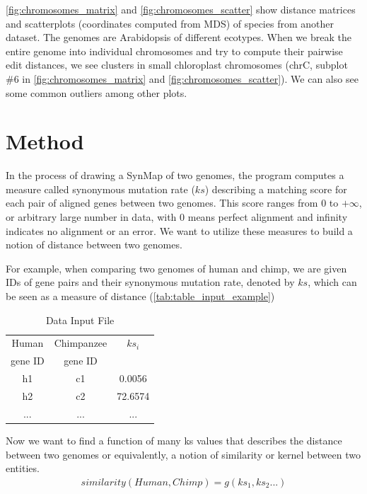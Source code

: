 \documentclass{vgtc}                      %
\begin{document}
\autoref{fig:chromosomes_matrix} and \autoref{fig:chromosomes_scatter} show distance matrices and scatterplots (coordinates computed from MDS) of species from another dataset. The genomes are Arabidopsis of different ecotypes. When we break the entire genome into individual chromosomes and try to compute their pairwise edit distances, we see clusters in small chloroplast chromosomes (chrC, subplot \#6 in \autoref{fig:chromosomes_matrix} and \autoref{fig:chromosomes_scatter}). We can also see some common outliers among other plots.

\section{Method}
In the process of drawing a SynMap of two genomes, the program computes a measure called synonymous mutation rate ($ks$) describing a matching score for each pair of aligned genes between two genomes. This score ranges from $0$ to $+\infty$, or arbitrary large number in data, with $0$ means perfect alignment and infinity indicates no alignment or an error. We want to utilize these measures to build a notion of distance between two genomes. 

For example, when comparing two genomes of human and chimp, we are given IDs of gene pairs and their synonymous mutation rate, denoted by $ks$, which can be seen as a measure of distance (\autoref{tab:table_input_example})

\begin{table}[h!]
\centering
\caption{Data Input File}
\label{tab:table_input_example}
\begin{tabular}{cc|c}
\toprule
Human & Chimpanzee & $ks_i$\\
gene ID & gene ID & \\
\midrule
h1 & c1 & 0.0056\\
h2 & c2 & 72.6574\\
... & ... & ...	\\
\bottomrule
\end{tabular}
\end{table}

Now we want to find a function of many ks values that describes the distance between two genomes or equivalently, a notion of similarity or kernel between two entities.
\begin{align}
similarity(Human, Chimp) = g(ks_1,ks_2...)
\end{align}
\end{document}
